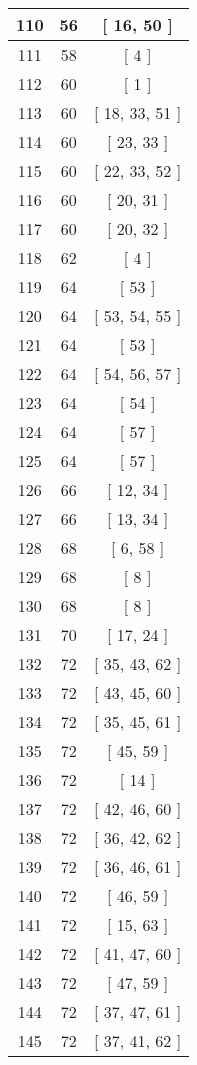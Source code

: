 \begin{center}
\begin{longtable}[H]{|| c c c ||}
\hline
110 & 56 & [ 16, 50 ] \\ 
\hline
111 & 58 & [ 4 ] \\ 
\hline
112 & 60 & [ 1 ] \\ 
\hline
113 & 60 & [ 18, 33, 51 ] \\ 
\hline
114 & 60 & [ 23, 33 ] \\ 
\hline
115 & 60 & [ 22, 33, 52 ] \\ 
\hline
116 & 60 & [ 20, 31 ] \\ 
\hline
117 & 60 & [ 20, 32 ] \\ 
\hline
118 & 62 & [ 4 ] \\ 
\hline
119 & 64 & [ 53 ] \\ 
\hline
120 & 64 & [ 53, 54, 55 ] \\ 
\hline
121 & 64 & [ 53 ] \\ 
\hline
122 & 64 & [ 54, 56, 57 ] \\ 
\hline
123 & 64 & [ 54 ] \\ 
\hline
124 & 64 & [ 57 ] \\ 
\hline
125 & 64 & [ 57 ] \\ 
\hline
126 & 66 & [ 12, 34 ] \\ 
\hline
127 & 66 & [ 13, 34 ] \\ 
\hline
128 & 68 & [ 6, 58 ] \\ 
\hline
129 & 68 & [ 8 ] \\ 
\hline
130 & 68 & [ 8 ] \\ 
\hline
131 & 70 & [ 17, 24 ] \\ 
\hline
132 & 72 & [ 35, 43, 62 ] \\ 
\hline
133 & 72 & [ 43, 45, 60 ] \\ 
\hline
134 & 72 & [ 35, 45, 61 ] \\ 
\hline
135 & 72 & [ 45, 59 ] \\ 
\hline
136 & 72 & [ 14 ] \\ 
\hline
137 & 72 & [ 42, 46, 60 ] \\ 
\hline
138 & 72 & [ 36, 42, 62 ] \\ 
\hline
139 & 72 & [ 36, 46, 61 ] \\ 
\hline
140 & 72 & [ 46, 59 ] \\ 
\hline
141 & 72 & [ 15, 63 ] \\ 
\hline
142 & 72 & [ 41, 47, 60 ] \\ 
\hline
143 & 72 & [ 47, 59 ] \\ 
\hline
144 & 72 & [ 37, 47, 61 ] \\ 
\hline
145 & 72 & [ 37, 41, 62 ] \\ 

\end{longtable}
\end{center}
